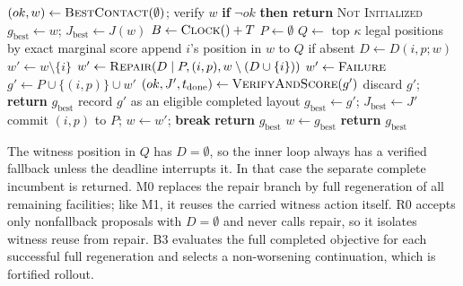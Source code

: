 \documentclass[preprint,12pt,authoryear,nonatbib]{elsarticle}
\newenvironment{paperalgorithm}{\begin{algorithm}[H]}{\end{algorithm}}
\begin{document}
\begin{paperalgorithm}
\caption{Completion-aware search with partial witness repair (M1).}
\label{alg:certified}
\footnotesize
\begin{algorithmic}[1]
\State $(ok,w)\gets\textsc{BestContact}(\emptyset)$; verify $w$
\State \textbf{if} $\lnot ok$ \textbf{then return} \textsc{Not Initialized}
\State $g_{\mathrm{best}}\gets w$; $J_{\mathrm{best}}\gets J(w)$
\State $B\gets\textsc{Clock}()+T$ 
  \State $P\gets\emptyset$ 
    \State $Q\gets$ top $\kappa$ legal positions by exact marginal score
    \State append $i$'s position in $w$ to $Q$ if absent
      \State $D\gets D(i,p;w)$
        \State $w'\gets w\setminus\{i\}$ 
        \State $w'\gets\textsc{Repair}(D\mid P,(i,p),w\setminus(D\cup\{i\}))$
      \Else
        \State $w'\gets\textsc{Failure}$
      \EndIf
        \State $g'\gets P\cup\{(i,p)\}\cup w'$
        \State $(ok,J',t_{\mathrm{done}})\gets\textsc{VerifyAndScore}(g')$
          \State discard $g'$; \textbf{return} $g_{\mathrm{best}}$
        \EndIf
          \State record $g'$ as an eligible completed layout
            \State $g_{\mathrm{best}}\gets g'$; $J_{\mathrm{best}}\gets J'$
          \EndIf
        \State commit $(i,p)$ to $P$; $w\gets w'$; \textbf{break}
        \EndIf
      \EndIf
    \EndFor
     \State \textbf{return} $g_{\mathrm{best}}$ \EndIf
  \EndFor
  \State $w\gets g_{\mathrm{best}}$ 
\EndWhile
\State \textbf{return} $g_{\mathrm{best}}$
\end{algorithmic}
\end{paperalgorithm}

The witness position in $Q$ has $D=\emptyset$, so the inner loop always has a
verified fallback unless the deadline interrupts it. In that case the separate
complete incumbent is returned. M0 replaces the repair branch by full
regeneration of all remaining facilities; like M1, it reuses the carried
witness action itself. R0 accepts only nonfallback proposals with $D=\emptyset$
and never calls repair, so it isolates witness reuse from repair. B3 evaluates the full completed
objective for each successful full regeneration and selects a non-worsening
continuation, which is fortified rollout.
\end{document}
